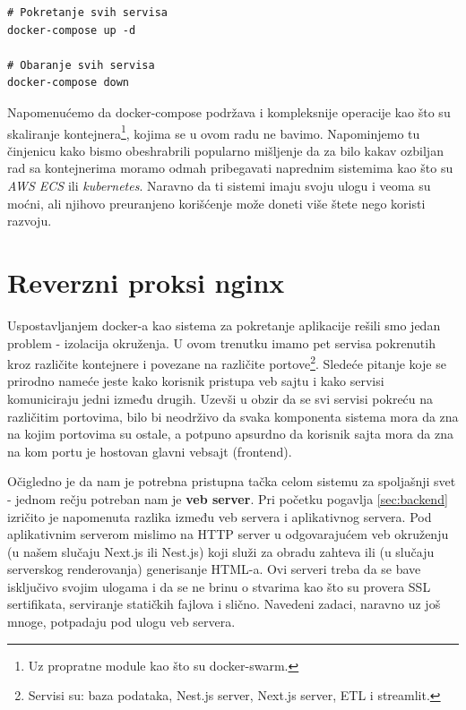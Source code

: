 \documentclass[12pt,oneside]{memoir}
\begin{document}
\newpage
\begin{lstlisting}[caption={docker-compose komande.}, label={lst:dockerlocalcommands}]
# Pokretanje svih servisa
docker-compose up -d 

# Obaranje svih servisa
docker-compose down
\end{lstlisting}

Napomenućemo da docker-compose podržava i kompleksnije operacije kao što su skaliranje kontejnera\footnote{Uz propratne module kao što su docker-swarm.}, kojima se u ovom radu ne bavimo. Napominjemo tu činjenicu kako bismo obeshrabrili popularno mišljenje da za bilo kakav ozbiljan rad sa kontejnerima moramo odmah pribegavati naprednim sistemima kao što su \textit{AWS ECS} ili \textit{kubernetes}. Naravno da ti sistemi imaju svoju ulogu i veoma su moćni, ali njihovo preuranjeno korišćenje može doneti više štete nego koristi razvoju.


\section{Reverzni proksi nginx}

Uspostavljanjem docker-a kao sistema za pokretanje aplikacije rešili smo jedan problem - izolacija okruženja. U ovom trenutku imamo pet servisa pokrenutih kroz različite kontejnere i povezane na različite portove\footnote{Servisi su: baza podataka, Nest.js server, Next.js server, ETL i streamlit.}. Sledeće pitanje koje se prirodno nameće jeste kako korisnik pristupa veb sajtu i kako servisi komuniciraju jedni između drugih. Uzevši u obzir da se svi servisi pokreću na različitim portovima, bilo bi neodrživo da svaka komponenta sistema mora da zna na kojim portovima su ostale, a potpuno apsurdno da korisnik sajta mora da zna na kom portu je hostovan glavni vebsajt (frontend).

Očigledno je da nam je potrebna pristupna tačka celom sistemu za spoljašnji svet - jednom rečju potreban nam je \textbf{veb server}. Pri početku pogavlja \ref{sec:backend} izričito je napomenuta razlika između veb servera i aplikativnog servera. Pod aplikativnim serverom mislimo na HTTP server u odgovarajućem veb okruženju (u našem slučaju Next.js ili Nest.js) koji služi za obradu zahteva ili (u slučaju serverskog renderovanja) generisanje HTML-a. Ovi serveri treba da se bave isključivo svojim ulogama i da se ne brinu o stvarima kao što su provera SSL sertifikata, serviranje statičkih fajlova i slično. Navedeni zadaci, naravno uz još mnoge, potpadaju pod ulogu veb servera.
\end{document}

